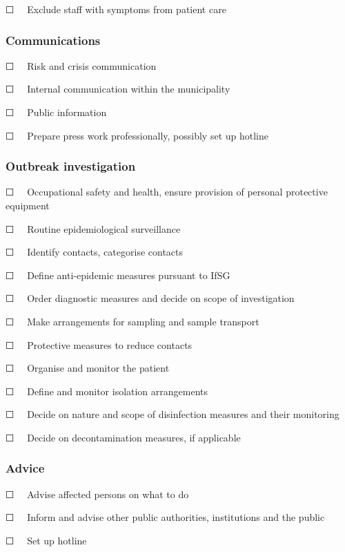 \documentclass{article}
\begin{document}
☐   Exclude staff with symptoms from patient care


\subsubsection{Communications}\label{H1662235}



☐   Risk and crisis communication


☐   Internal communication within the municipality


☐   Public information


☐   Prepare press work professionally, possibly set up hotline 


\subsubsection{Outbreak investigation }\label{H6402131}



☐   Occupational safety and health, ensure provision of personal protective equipment


☐   Routine epidemiological surveillance


☐   Identify contacts, categorise contacts


☐   Define anti-epidemic measures pursuant to IfSG


☐   Order diagnostic measures and decide on scope of investigation


☐   Make arrangements for sampling and sample transport


☐   Protective measures to reduce contacts


☐   Organise and monitor the patient


☐   Define and monitor isolation arrangements 


☐   Decide on nature and scope of disinfection measures and their monitoring


☐   Decide on decontamination measures, if applicable 


\subsubsection{Advice}\label{H4067619}



☐   Advise affected persons on what to do


☐   Inform and advise other public authorities, institutions and the public


☐   Set up hotline
\end{document}
